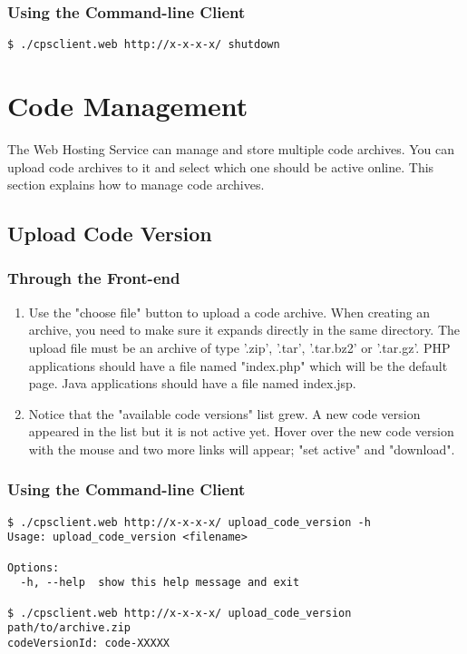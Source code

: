 \documentclass[10pt]{article}
\newenvironment{framedbox}[1]%
{\begin{framed}
 \begingroup
 \fontsize{#1}{#1}\selectfont
}
{
 \endgroup
 \end{framed}
}
\begin{document}
\subsubsection{Using the Command-line Client}
\begin{framedbox}{8pt}\begin{verbatim}
$ ./cpsclient.web http://x-x-x-x/ shutdown
\end{verbatim}\end{framedbox}

\section{Code Management}
The Web Hosting Service can manage and store multiple code archives. You can
upload code archives to it and select which one should be active online.
This section explains how to manage code archives.

\subsection{Upload Code Version}
\subsubsection{Through the Front-end}
\begin{enumerate}
\item Use the "choose file" button to upload a code archive. When creating an
      archive, you need to make sure it expands directly in the same directory.
      The upload file must be an archive of type '.zip', '.tar', '.tar.bz2' or
      '.tar.gz'. PHP applications should have a file named "index.php"
      which will be the default page. Java applications should have a file
      named index.jsp.
\item Notice that the "available code versions" list grew. A new code version
      appeared in the list but it is not active yet. Hover over the new code
      version with the mouse and two more links will appear; "set active" and
      "download".
\end{enumerate}


\subsubsection{Using the Command-line Client}
\begin{framedbox}{8pt}\begin{verbatim}
$ ./cpsclient.web http://x-x-x-x/ upload_code_version -h
Usage: upload_code_version <filename>

Options:
  -h, --help  show this help message and exit

$ ./cpsclient.web http://x-x-x-x/ upload_code_version path/to/archive.zip
codeVersionId: code-XXXXX
\end{verbatim}\end{framedbox}
\end{document}
